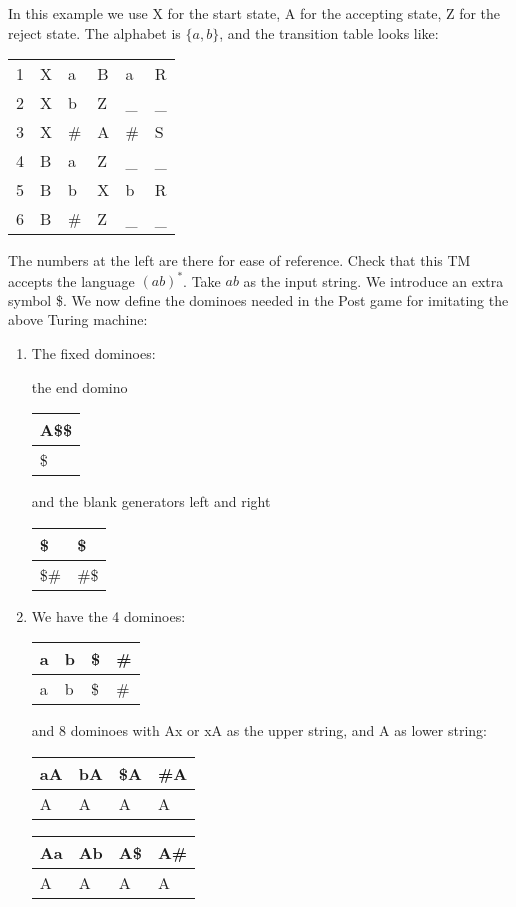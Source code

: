 \begin{example}
In this example we use X for the start state, A for the accepting
state, Z for the reject state. The alphabet is $\{a,b\}$, and the
transition table looks like:

\begin{center}
\begin{tabular}{|r||l|l||l|l|l|}
\hline
1 & X & a & B & a & R \\
2 & X & b & Z & \_ & \_ \\
3 & X & \# & A & \# & S \\
4 & B & a  & Z & \_ & \_ \\
5 & B & b  & X & b  & R  \\
6 & B & \# & Z & \_ & \_ \\
\hline
\end{tabular}
\end{center}

The numbers at the left are there for ease of reference. Check that
this TM accepts the language $(ab)^*$. Take $ab$ as the input string.
%
We introduce an extra symbol \$. We now define the dominoes needed in
the Post game for imitating the above Turing machine:

\begin{enumerate}
\item The fixed dominoes:

the end domino
\begin{tabular}{|l|}
\hline
A\$\$                     \\ \hline
   \$                     \\
\hline
\end{tabular}
and the blank generators left and right
\begin{tabular}{|l||l|}
\hline
        \$   & \$         \\ \hline
        \$\# & \#\$       \\
\hline
\end{tabular}


\item We have the 4 dominoes:

\begin{tabular}{|l||l||l||l|}
\hline
a & b & \$ & \# \\ \hline
a & b & \$ & \# \\ \hline
\end{tabular}

and 8 dominoes with Ax or xA as the upper string, and A as lower
string:

\begin{tabular}{|l||l||l||l|}
\hline
aA & bA & \$A & \#A \\ \hline
A & A & A & A \\
\hline
\end{tabular}\quad
\begin{tabular}{|l||l||l||l|}
\hline
Aa & Ab & A\$ & A\# \\ \hline
A & A & A & A \\
\hline
\end{tabular}


\end{enumerate}
\end{example}
